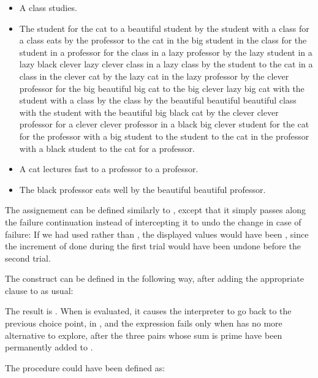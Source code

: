 \begin{exe}[4.50]
\begin{itemize}
        \item A class studies.
        \item The student for the cat to a beautiful student by the student with 
            a class for a class eats by the professor to the cat in the big 
            student in the class for the student in a professor for the class in 
            a lazy professor by the lazy student in a lazy black clever lazy 
            clever class in a lazy class by the student to the cat in a class in 
            the clever cat by the lazy cat in the lazy professor by the clever 
            professor for the big beautiful big cat to the big clever lazy big 
            cat with the student with a class by the class by the beautiful 
            beautiful beautiful class with the student with the beautiful big 
            black cat by the clever clever professor for a clever clever 
            professor in a black big clever student for the cat for the 
            professor with a big student to the student to the cat in the 
            professor with a black student to the cat for a professor.
        \item A cat lectures fast to a professor to a professor.
        \item The black professor eats well by the beautiful beautiful 
            professor.
    \end{itemize}
\end{exe}

\begin{exe}[4.51]
    The  assignement can be defined similarly to 
    , except that it simply passes along the failure continuation 
    instead of intercepting it to undo the change in case of failure:
    If we had used  rather than , the displayed 
    values would have been , since the increment of  
    done during the first trial would have been undone before the second trial.
\end{exe}

\begin{exe}[4.52]
    The  construct can be defined in the following way, after 
    adding the appropriate clause to  as usual:
\end{exe}

\begin{exe}[4.53]
    The result is . When  is 
    evaluated, it causes the interpreter to go back to the previous choice 
    point, in , and the  expression fails only 
    when  has no more alternative to explore, after the 
    three pairs whose sum is prime have been permanently added to .
\end{exe}

\begin{exe}[4.54]
    The  procedure could have been defined as:
\end{exe}
